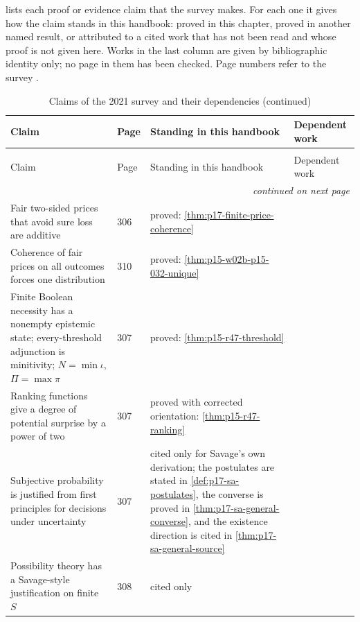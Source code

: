 lists each proof or evidence claim that
the survey makes. For each one it gives how the claim stands in this
handbook: proved in this chapter, proved in another named result, or
attributed to a cited work that has not been read and whose proof is not
given here. Works in the last column are given by bibliographic identity
only; no page in them has been checked. Page numbers refer to the survey
\cite{DuboisPrade2021RepresentingBelief}.

\begin{longtable}{@{}p{.36\linewidth}p{.07\linewidth}p{.27\linewidth}p{.22\linewidth}@{}}
\caption{Claims of the 2021 survey and the result or source on which each depends.}
\label{tab:p15-w02b-p15-032-claims}\\
\toprule Claim & Page & Standing in this handbook & Dependent work \\
\midrule\endfirsthead
\caption[]{Claims of the 2021 survey and their dependencies (continued)}\\
\toprule Claim & Page & Standing in this handbook & Dependent work \\
\midrule\endhead
\midrule\multicolumn{4}{r}{\emph{continued on next page}}\\
\endfoot
\endlastfoot
Fair two-sided prices that avoid sure loss are additive & 306 &
proved: \cref{thm:p17-finite-price-coherence} & \cite{R47DeFinetti1937} \\
Coherence of fair prices on all outcomes forces one distribution & 310 &
proved: \cref{thm:p15-w02b-p15-032-unique} & \cite{R47Lindley1982} \\
Finite Boolean necessity has a nonempty epistemic state; every-threshold
adjunction is minitivity; \(N=\min\iota\), \(\Pi=\max\pi\) & 307 &
proved: \cref{thm:p15-r47-threshold} & \cite{R47DuboisPrade1988} \\
Ranking functions give a degree of potential surprise by a power of two &
307 & proved with corrected orientation: \cref{thm:p15-r47-ranking} &
\cite{R47Spohn1988} \\
Subjective probability is justified from first principles for decisions
under uncertainty & 307 & cited only for Savage's own derivation; the
postulates are stated in \cref{def:p17-sa-postulates}, the converse is
proved in \cref{thm:p17-sa-general-converse}, and the existence direction
is cited in \cref{thm:p17-sa-general-source} & \cite{R47Savage1954} \\
Possibility theory has a Savage-style justification on finite \(S\) &
308 & cited only & \cite{R47DuboisPradeSabbadin2001} \\

\end{longtable}
